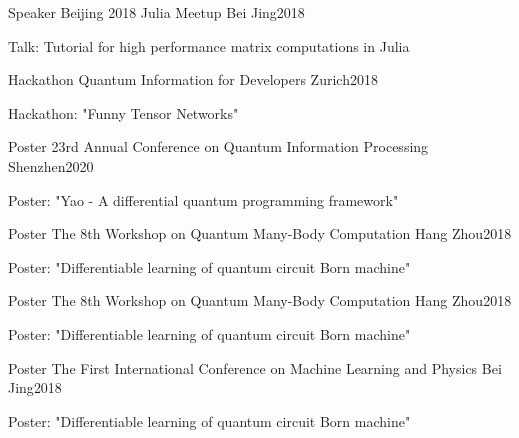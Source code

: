 \documentclass[11pt, a4paper]{awesome-cv}
\begin{document}
\begin{cventries}
{\begin{cvitems}
    \end{cvitems}
    }
\cventry
    {Speaker}
    {Beijing 2018 Julia Meetup}
    {Bei Jing}{2018}
    {
    \begin{cvitems}
        Talk: Tutorial for high performance matrix computations in Julia
    \end{cvitems}
    }
\cventry
    {Hackathon}
    {Quantum Information for Developers}
    {Zurich}{2018}
    {
    \begin{cvitems}
        Hackathon: "Funny Tensor Networks"
    \end{cvitems}
    }
\cventry
    {Poster}
    {23rd Annual Conference on Quantum Information Processing}
    {Shenzhen}{2020}
    {
    \begin{cvitems}
        Poster: "Yao - A differential quantum programming framework"
    \end{cvitems}
    }
\cventry
    {Poster}
    {The 8th Workshop on Quantum Many-Body Computation}
    {Hang Zhou}{2018}
    {
    \begin{cvitems}
        Poster: "Differentiable learning of quantum circuit Born machine"
    \end{cvitems}
    }
\cventry
    {Poster}
    {The 8th Workshop on Quantum Many-Body Computation}
    {Hang Zhou}{2018}
    {
    \begin{cvitems}
        Poster: "Differentiable learning of quantum circuit Born machine"
    \end{cvitems}
    }

\cventry
    {Poster}
    {The First International Conference on Machine Learning and Physics}
    {Bei Jing}{2018}
    {
    \begin{cvitems}
        Poster: "Differentiable learning of quantum circuit Born machine"
    \end{cvitems}
    }
\end{cventries}
\end{document}

